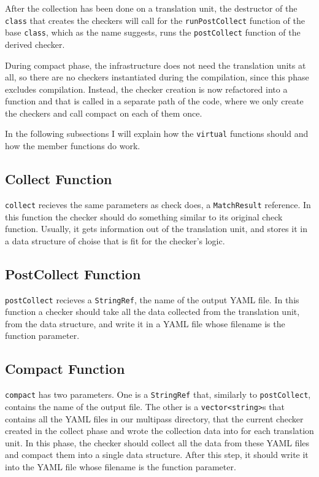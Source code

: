 After the collection has been done on a translation unit, the destructor of the \lstinline{class} that
creates the checkers will call for the \texttt{runPostCollect} function of the base
\lstinline{class}, which as the name suggests, runs the \texttt{postCollect} function of the derived checker.

During compact phase, the infrastructure does not need the translation units at all, so there are no checkers instantiated during the
compilation, since this phase excludes compilation. Instead, the checker creation is now refactored into a function and that is called
in a separate path of the code, where we only create the checkers and call compact on each of them once.

In the following subsections I will explain how the \lstinline{virtual} functions should and how the member functions do work.

\subsection{Collect Function}

\texttt{collect} recieves the same parameters as check does, a \texttt{MatchResult} reference. In this function the checker should
do something similar to its original check function. Usually, it gets information out of the translation unit, and stores it in a data
structure of choise that is fit for the checker's logic.

\subsection{PostCollect Function}

\texttt{postCollect} recieves a \lstinline{StringRef}, the name of the output YAML file. In this function a checker should take all the data
collected from the translation unit, from the data structure, and write it in a YAML file whose filename is the function parameter.

\subsection{Compact Function}

\texttt{compact} has two parameters. One is a \lstinline{StringRef} that, similarly to \texttt{postCollect}, contains the
name of the output file.
The other is a \lstinline{vector<string>}s that contains all the YAML files in our multipass directory, that the
current checker created in the collect phase and wrote the collection data into for each translation unit.
In this phase, the checker should collect all the data from these YAML files and compact them into a single data structure. After
this step, it should write it into the YAML file whose filename is the function parameter.


